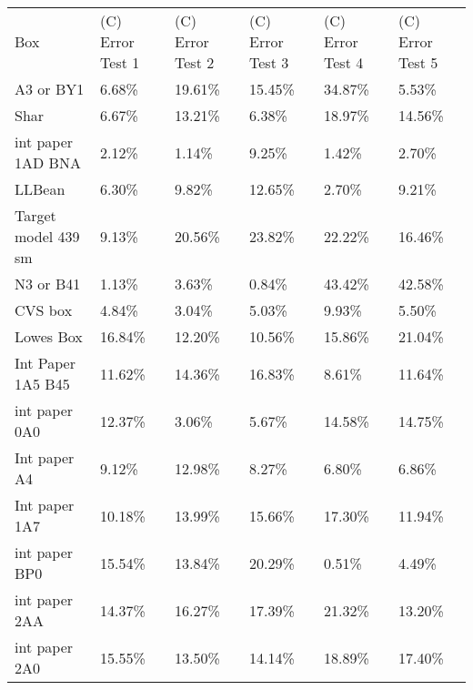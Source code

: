 \documentclass[11pt, twoside, reqno]{book}
\begin{document}
\begin{table}[]
	\centering

	\label{AR1G}
	\tiny
	\begin{tabular}{llllll}
		Box                 & (C) Error Test 1 & (C) Error Test 2 & (C) Error Test 3 & (C) Error Test 4 & (C) Error Test 5 \\
		A3 or BY1           & 6.68\%           & 19.61\%          & 15.45\%          & 34.87\%          & 5.53\%           \\
		Shar                & 6.67\%           & 13.21\%          & 6.38\%           & 18.97\%          & 14.56\%          \\
		int paper 1AD BNA   & 2.12\%           & 1.14\%           & 9.25\%           & 1.42\%           & 2.70\%           \\
		LLBean              & 6.30\%           & 9.82\%           & 12.65\%          & 2.70\%           & 9.21\%           \\
		Target model 439 sm & 9.13\%           & 20.56\%          & 23.82\%          & 22.22\%          & 16.46\%          \\
		N3 or B41           & 1.13\%           & 3.63\%           & 0.84\%           & 43.42\%          & 42.58\%          \\
		CVS box             & 4.84\%           & 3.04\%           & 5.03\%           & 9.93\%           & 5.50\%           \\
		Lowes Box           & 16.84\%          & 12.20\%          & 10.56\%          & 15.86\%          & 21.04\%          \\
		Int Paper 1A5 B45   & 11.62\%          & 14.36\%          & 16.83\%          & 8.61\%           & 11.64\%          \\
		int paper 0A0       & 12.37\%          & 3.06\%           & 5.67\%           & 14.58\%          & 14.75\%          \\
		Int paper A4        & 9.12\%           & 12.98\%          & 8.27\%           & 6.80\%           & 6.86\%           \\
		Int paper 1A7       & 10.18\%          & 13.99\%          & 15.66\%          & 17.30\%          & 11.94\%          \\
		int paper BP0       & 15.54\%          & 13.84\%          & 20.29\%          & 0.51\%           & 4.49\%           \\
		int paper 2AA       & 14.37\%          & 16.27\%          & 17.39\%          & 21.32\%          & 13.20\%          \\
		int paper 2A0       & 15.55\%          & 13.50\%          & 14.14\%          & 18.89\%          & 17.40\%          \\

\end{tabular}
\end{table}
\end{document}
